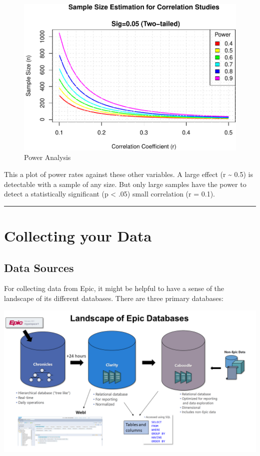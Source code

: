 \documentclass[
]{report}
\begin{document}
\begin{figure}
\centering
\includegraphics{index_files/figure-latex/power-1.pdf}
\caption{Power Analysis}
\end{figure}

This a plot of power rates against these other variables. A large effect
(r \textasciitilde{} 0.5) is detectable with a sample of any size. But
only large samples have the power to detect a statistically significant
(p \textless{} .05) small correlation (r = 0.1).

\begin{center}\rule{0.5\linewidth}{0.5pt}\end{center}

\hypertarget{collecting-your-data}{%
\chapter{Collecting your Data}\label{collecting-your-data}}

\hypertarget{data-sources}{%
\section{Data Sources}\label{data-sources}}

For collecting data from Epic, it might be helpful to have a sense of
the landscape of its different databases. There are three primary
databases:

\includegraphics{EpicDataLandscape.png}
\end{document}
